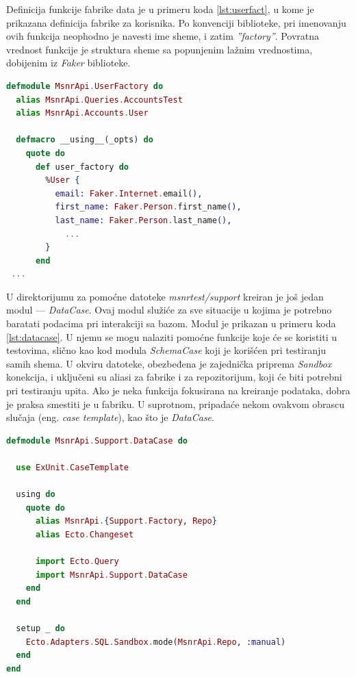 \documentclass[12pt,oneside]{memoir}
\begin{document}
\par Definicija funkcije fabrike data je u primeru koda \ref{lst:userfact}, u kome je prikazana definicija fabrike za korisnika. Po konvenciji biblioteke, pri imenovanju ovih funkcija neophodno je navesti ime sheme, i zatim \emph{''{\textunderscore}factory''}. Povratna vrednost funkcije je struktura sheme sa popunjenim lažnim vrednostima, dobijenim iz \emph{Faker} biblioteke. 

\begin{lstlisting}[language=elixir, caption={Definicija modula \emph{UserFactory}},captionpos=b, label={lst:userfact}]
defmodule MsnrApi.UserFactory do
  alias MsnrApi.Queries.AccountsTest
  alias MsnrApi.Accounts.User

  defmacro __using__(_opts) do
    quote do
      def user_factory do
        %User {
          email: Faker.Internet.email(),
          first_name: Faker.Person.first_name(),
          last_name: Faker.Person.last_name(),
         	...
        }
      end
 ...
\end{lstlisting}

\par U direktorijumu za pomoćne datoteke \emph{msnr{\textunderscore}test/support} kreiran je još jedan modul --- \emph{DataCase}. Ovaj modul služiće za sve situacije u kojima je potrebno baratati podacima pri interakciji sa bazom. Modul je prikazan u primeru koda \ref{lst:datacase}. U njemu se mogu nalaziti pomoćne funkcije koje će se koristiti u testovima, slično kao kod modula \emph{SchemaCase} koji je korišćen pri testiranju samih shema. U okviru datoteke, obezbeđena je zajednička priprema \emph{Sandbox} konekcija, i uključeni su aliasi za fabrike i za repozitorijum, koji će biti potrebni pri testiranju upita. Ako je neka funkcija fokusirana na kreiranje podataka, dobra je praksa smestiti je u fabriku. U suprotnom, pripadaće nekom ovakvom obrascu slučaja (eng. \emph{case template}), kao što je \emph{DataCase}. 

\begin{lstlisting}[language=elixir, caption={Definicija modula \emph{DataCase}},captionpos=b, label={lst:datacase}]
defmodule MsnrApi.Support.DataCase do

  use ExUnit.CaseTemplate

  using do
    quote do
      alias MsnrApi.{Support.Factory, Repo}
      alias Ecto.Changeset

      import Ecto.Query
      import MsnrApi.Support.DataCase
    end
  end

  setup _ do
    Ecto.Adapters.SQL.Sandbox.mode(MsnrApi.Repo, :manual)
  end
end
\end{lstlisting}
\end{document}
